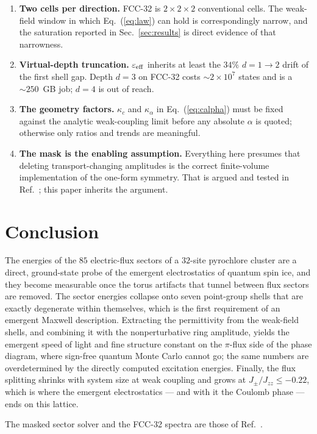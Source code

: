 \documentclass[aps,prb,preprint,amsmath,amssymb,superscriptaddress,
longbibliography,floatfix]{revtex4-2}
\newcommand{\Jzz}{J_{zz}}
\newcommand{\Jpm}{J_{\pm}}
\begin{document}
\begin{enumerate}
\item \textbf{Two cells per direction.}  FCC-32 is $2\times2\times2$
conventional cells.  The weak-field window in which Eq.~(\ref{eq:law}) can hold
is correspondingly narrow, and the saturation reported in
Sec.~\ref{sec:results} is direct evidence of that narrowness.
\item \textbf{Virtual-depth truncation.}  $\varepsilon_{\rm eff}$ inherits at
least the $34\%$ $d=1\to2$ drift of the first shell gap.  Depth $d=3$ on
FCC-32 costs $\sim2\times10^7$ states and is a $\sim250$~GB job; $d=4$ is out
of reach.
\item \textbf{The geometry factors.}  $\kappa_c$ and $\kappa_\alpha$ in
Eq.~(\ref{eq:calpha}) must be fixed against the analytic weak-coupling limit
before any absolute $\alpha$ is quoted; otherwise only ratios and trends are
meaningful.
\item \textbf{The mask is the enabling assumption.}  Everything here presumes
that deleting transport-changing amplitudes is the correct finite-volume
implementation of the one-form symmetry.  That is argued and tested in
Ref.~\cite{ZhouKimMask}; this paper inherits the argument.
\end{enumerate}

\section{Conclusion}

The energies of the $85$ electric-flux sectors of a $32$-site pyrochlore
cluster are a direct, ground-state probe of the emergent electrostatics of
quantum spin ice, and they become measurable once the torus artifacts that
tunnel between flux sectors are removed.  The sector energies collapse onto
seven point-group shells that are exactly degenerate within themselves, which
is the first requirement of an emergent Maxwell description.  Extracting the
permittivity from the weak-field shells, and combining it with the
nonperturbative ring amplitude, yields the emergent speed of light and fine
structure constant on the $\pi$-flux side of the phase diagram, where sign-free
quantum Monte Carlo cannot go; the same numbers are overdetermined by the
directly computed excitation energies.  Finally, the flux splitting shrinks
with system size at weak coupling and grows at $\Jpm/\Jzz\le-0.22$, which is
where the emergent electrostatics --- and with it the Coulomb phase --- ends on
this lattice.

\begin{acknowledgments}
The masked sector solver and the FCC-32 spectra are those of
Ref.~\cite{ZhouKimMask}.
\end{acknowledgments}



\end{document}
